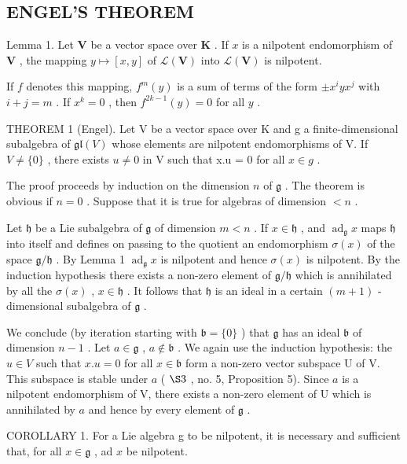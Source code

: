 \subsection{ENGEL'S THEOREM}

Lemma 1. Let \(\mathbf{V}\) be a vector space over \(\mathbf{K}\) . If \(x\) is a nilpotent endomorphism of \(\mathbf{V}\) , the mapping \(y \mapsto [x, y]\) of \(\mathcal{L}(\mathbf{V})\) into \(\mathcal{L}(\mathbf{V})\) is nilpotent.

If \(f\) denotes this mapping, \(f^m(y)\) is a sum of terms of the form \(\pm x^i y x^j\) with \(i + j = m\) . If \(x^k = 0\) , then \(f^{2k - 1}(y) = 0\) for all \(y\) .

THEOREM 1 (Engel). Let V be a vector space over K and g a finite-dimensional subalgebra of \(\mathfrak{gl}(V)\) whose elements are nilpotent endomorphisms of V. If \(V \neq \{0\}\) , there exists \(u \neq 0\) in V such that x.u = 0 for all \(x \in g\) .

The proof proceeds by induction on the dimension \(n\) of \(\mathfrak{g}\) . The theorem is obvious if \(n = 0\) . Suppose that it is true for algebras of dimension \(< n\) .

Let \(\mathfrak{h}\) be a Lie subalgebra of \(\mathfrak{g}\) of dimension \(m < n\) . If \(x \in \mathfrak{h}\) , and \(\operatorname{ad}_{\mathfrak{g}} x\) maps \(\mathfrak{h}\) into itself and defines on passing to the quotient an endomorphism \(\sigma(x)\) of the space \(\mathfrak{g} / \mathfrak{h}\) . By Lemma 1 \(\operatorname{ad}_{\mathfrak{g}} x\) is nilpotent and hence \(\sigma(x)\) is nilpotent. By the induction hypothesis there exists a non-zero element of \(\mathfrak{g} / \mathfrak{h}\) which is annihilated by all the \(\sigma(x)\) , \(x \in \mathfrak{h}\) . It follows that \(\mathfrak{h}\) is an ideal in a certain \((m + 1)\) -dimensional subalgebra of \(\mathfrak{g}\) .

We conclude (by iteration starting with \(\mathfrak{b} = \{0\}\) ) that \(\mathfrak{g}\) has an ideal \(\mathfrak{b}\) of dimension \(n - 1\) . Let \(a \in \mathfrak{g}\) , \(a \notin \mathfrak{b}\) . We again use the induction hypothesis: the \(u \in V\) such that \(x.u = 0\) for all \(x \in \mathfrak{b}\) form a non-zero vector subspace U of V. This subspace is stable under \(a\) ( \(\S 3\) , no. 5, Proposition 5). Since \(a\) is a nilpotent endomorphism of V, there exists a non-zero element of U which is annihilated by \(a\) and hence by every element of \(\mathfrak{g}\) .

COROLLARY 1. For a Lie algebra g to be nilpotent, it is necessary and sufficient that, for all \(x \in \mathfrak{g}\) , ad \(x\) be nilpotent.

